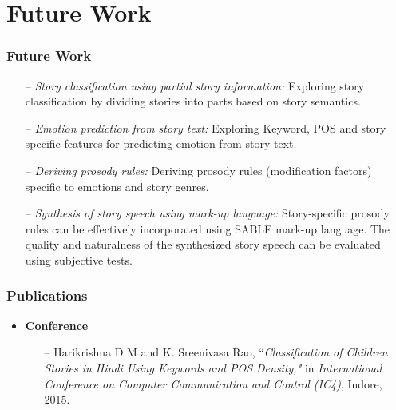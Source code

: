 \documentclass{beamer}
\begin{document}
\section{Future Work}
\begin{frame}
\frametitle{Future Work}
\begin{itemize}
\item[--] \textit{Story classification using partial story information:} Exploring story classification by dividing stories into parts based on story semantics.
\item[--] \textit{Emotion prediction from story text:} Exploring Keyword, POS and story specific features for predicting emotion from story text.
\item[--] \textit{Deriving prosody rules:} Deriving prosody rules (modification factors) specific to emotions and story genres.
\item[--] \textit{Synthesis of story speech using mark-up language:} Story-specific prosody rules can be effectively incorporated using SABLE mark-up language. The quality and naturalness of the synthesized story speech can be evaluated using subjective tests.
\end{itemize}
\end{frame}

\begin{frame}
\frametitle{Publications}
\label{Publications}
\begin{itemize}
\item \textbf{Conference}
	\begin{itemize}
	 	\item[--]  Harikrishna D M and K. Sreenivasa Rao, ``\textit{Classification of Children Stories in Hindi Using Keywords and POS Density,"} in \textit{International Conference on Computer Communication and Control (IC4)}, Indore, 2015. 
	 	\end{itemize}
\end{itemize}
\end{frame}

\end{document}
